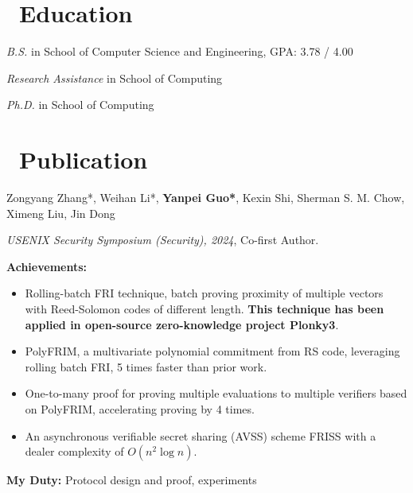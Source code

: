 \documentclass{resume}
\begin{document}



\section{\faGraduationCap\ Education}
\textit{B.S.} in School of Computer Science and Engineering, GPA: 3.78 / 4.00

\textit{Research Assistance} in School of Computing

\textit{Ph.D.} in School of Computing

\section{\faBook\ Publication}

Zongyang Zhang*, Weihan Li*, \textbf{Yanpei Guo*}, Kexin Shi, Sherman S. M. Chow, Ximeng Liu, Jin Dong

\textit{USENIX Security Symposium (Security), 2024}, Co-first Author.

\textbf{Achievements:}
\begin{itemize}
  \item Rolling-batch FRI technique, batch proving proximity of multiple vectors with Reed-Solomon codes of different length. 
  \textbf{This technique has been applied in open-source zero-knowledge project Plonky3}.
  \item PolyFRIM, a multivariate polynomial commitment from RS code, leveraging rolling batch FRI, 5 times faster than prior work.
  \item One-to-many proof for proving multiple evaluations to multiple verifiers based on PolyFRIM, accelerating proving by 4 times.
  \item An asynchronous verifiable secret sharing (AVSS) scheme FRISS with a dealer complexity of $O(n^2 \log n)$. 
\end{itemize}
\textbf{My Duty:} Protocol design and proof, experiments
\end{document}
